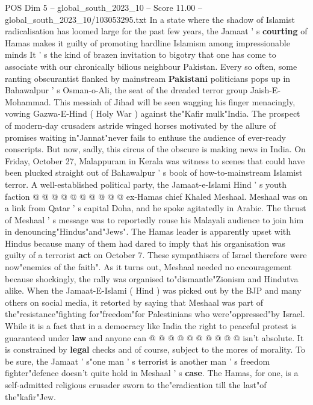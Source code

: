 \begin{textsample}{POS Dim 5 – global\_south\_2023\_10 – Score 11.00 – global\_south\_2023\_10/103053295.txt}  \label{ex:f5_pos_369}
In a state where the shadow of Islamist radicalisation has loomed large for the past few years, the Jamaat ' s \textbf{courting} of Hamas makes it guilty of promoting hardline Islamism among impressionable minds It ' s the kind of brazen invitation to bigotry that one has come to associate with our chronically bilious neighbour Pakistan.
Every so often, some ranting obscurantist flanked by mainstream \textbf{Pakistani} politicians pops up in Bahawalpur ' s Osman-o-Ali, the seat of the dreaded terror group Jaish-E-Mohammad.
This messiah of Jihad will be seen wagging his finger menacingly, vowing Gazwa-E-Hind ( Holy War ) against the"Kafir mulk"India.
The prospect of modern-day crusaders astride winged horses motivated by the allure of promises waiting in"Jannat"never fails to enthuse the audience of ever-ready conscripts.
But now, sadly, this circus of the obscure is making news in India.
On Friday, October 27, Malappuram in Kerala was witness to scenes that could have been plucked straight out of Bahawalpur ' s book of how-to-mainstream Islamist terror.
A well-established political party, the Jamaat-e-Islami Hind ' s youth faction @ @ @ @ @ @ @ @ @ @ ex-Hamas chief Khaled Meshaal.
Meshaal was on a link from Qatar ' s capital Doha, and he spoke agitatedly in Arabic.
The thrust of Meshaal ' s message was to reportedly rouse his Malayali audience to join him in denouncing"Hindus"and"Jews".
The Hamas leader is apparently upset with Hindus because many of them had dared to imply that his organisation was guilty of a terrorist \textbf{act} on October 7.
These sympathisers of Israel therefore were now"enemies of the faith".
As it turns out, Meshaal needed no encouragement because shockingly, the rally was organised to"dismantle"Zionism and Hindutva alike.
When the Jamaat-E-Islami ( Hind ) was picked out by the BJP and many others on social media, it retorted by saying that Meshaal was part of the"resistance"fighting for"freedom"for Palestinians who were"oppressed"by Israel.
While it is a fact that in a democracy like India the right to peaceful protest is guaranteed under \textbf{law} and anyone can @ @ @ @ @ @ @ @ @ @ isn't absolute.
It is constrained by \textbf{legal} checks and of course, subject to the mores of morality.
To be sure, the Jamaat ' s"one man ' s terrorist is another man ' s freedom fighter"defence doesn't quite hold in Meshaal ' s \textbf{case}.
The Hamas, for one, is a self-admitted religious crusader sworn to the"eradication till the last"of the"kafir"Jew.

\end{textsample}
